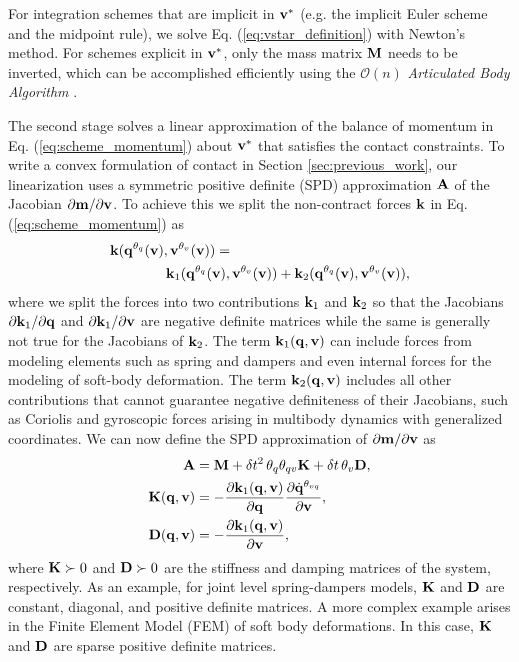 For integration schemes that are implicit in ${\mathbf{v}}^*$ (e.g. the implicit Euler
scheme and the midpoint rule), we solve Eq. (\ref{eq:vstar_definition}) with
Newton's method. For schemes explicit in ${\mathbf{v}}^*$, only the mass matrix
${\mathbf{M}}$ needs to be inverted, which can be accomplished efficiently using the
$\mathcal{O}(n)$ \emph{Articulated Body Algorithm}
\cite{bib:featherstone2008_rigid_body_dynamics_algorithms}.

The second stage solves a linear approximation of the balance of momentum in Eq.
(\ref{eq:scheme_momentum}) about ${\mathbf{v}}^*$ that satisfies the contact
constraints. To write a convex formulation of contact in Section
\ref{sec:previous_work}, our linearization uses a symmetric positive definite
(SPD) approximation ${\mathbf{A}}$ of the Jacobian $\partial {\mathbf{m}}/\partial {\mathbf{v}}$.
To achieve this we split the non-contract forces ${\mathbf{k}}$ in Eq.
(\ref{eq:scheme_momentum}) as
\begin{align*}
	&{\mathbf{k}}({\mathbf{q}}^{\theta_{q}}({\mathbf{v}}), {\mathbf{v}}^{\theta_v}({\mathbf{v}})) = \\
    &\qquad\qquad {\mathbf{k}}_1({\mathbf{q}}^{\theta_{q}}({\mathbf{v}}), {\mathbf{v}}^{\theta_v}({\mathbf{v}}))+
	{\mathbf{k}}_2({\mathbf{q}}^{\theta_{q}}({\mathbf{v}}), {\mathbf{v}}^{\theta_v}({\mathbf{v}})),
\end{align*}
where we split the forces into two contributions ${\mathbf{k}}_1$ and ${\mathbf{k}}_2$ so
that the Jacobians $\partial {\mathbf{k}}_1/\partial{\mathbf{q}}$ and $\partial
{\mathbf{k}}_1/\partial{\mathbf{v}}$ are negative definite matrices while the same is
generally not true for the Jacobians of ${\mathbf{k}}_2$. The term ${\mathbf{k}}_1({\mathbf{q}},
{\mathbf{v}})$ can include forces from modeling elements such as spring and dampers
and even internal forces for the modeling of soft-body deformation. The term
${\mathbf{k}}_2({\mathbf{q}}, {\mathbf{v}})$ includes all other contributions that cannot
guarantee negative definiteness of their Jacobians, such as Coriolis and
gyroscopic forces arising in multibody dynamics with generalized coordinates. We
can now define the SPD approximation of $\partial {\mathbf{m}}/\partial {\mathbf{v}}$ as
\begin{align}
	\mf{A}&=\mf{M}+\delta t^2\,\theta_q\theta_{qv}\mf{K}+\delta t\,\theta_v\mf{D},
	\label{eq:expression_for_A}\\
	\mf{K}(\mf{q}, \mf{v})&=-\frac{\partial \mf{k}_1(\mf{q}, \mf{v})}{\partial
	\mf{q}}\frac{\partial\dot{\mf{q}}^{\theta_{vq}}}{\partial\mf{v}},
	\label{eq:stiffness_matrix}\\
	\mf{D}(\mf{q}, \mf{v})&=-\frac{\partial \mf{k}_1(\mf{q}, \mf{v})}{\partial
	\mf{v}},
	\label{eq:dissipation_matrix}
\end{align}
where ${\mathbf{K}} \succ 0$ and ${\mathbf{D}}\succ 0$ are the stiffness and damping
matrices of the system, respectively. As an example, for joint level
spring-dampers models, ${\mathbf{K}}$ and ${\mathbf{D}}$ are constant, diagonal, and
positive definite matrices. A more complex example arises in the Finite Element
Model (FEM) of soft body deformations. In this case, ${\mathbf{K}}$ and ${\mathbf{D}}$ are
sparse positive definite matrices.

